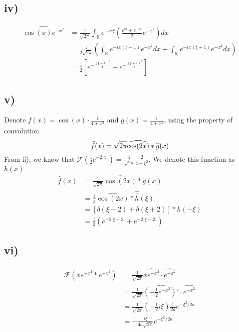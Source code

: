 \documentclass[a4paper, 11pt]{article}
\begin{document}
\begin{spacing}{1.5}
\subsection*{iv)}
\begin{align*}
\widehat{ \cos(x) e^{-x^2} }
	& = \frac{1}{\sqrt{2\pi}} \int_{\mathbb{R}} e^{-ix\xi} \left( \frac{e^{ix} + e^{-ix}}{2} e^{-x^2}\right) dx  \\
	& = \frac{1}{2\sqrt{2\pi}} \left( \int_{\mathbb{R}} e^{-ix(\xi-1)} e^{-x^2} dx + \int_{\mathbb{R}} e^{-ix(\xi+1)} e^{-x^2} dx \right)  \\
	& = \frac{1}{2} \left[ e^{-\frac{(\xi-1)^2}{4}} + e^{-\frac{(\xi+1)^2}{4}} \right]
\end{align*}

\subsection*{v)}
Denote $f(x) = \cos(x) \cdot \frac{1}{4+x^2}$ and $g(x) =\frac{1}{4+x^2} $, using the property of convolution
$$
\widehat{ f }(x) = \sqrt{2\pi} \widehat{ \cos(2x) } * \widehat{g}(x)  \\
$$
From ii), we know that $\mathcal{F} \left( \frac{1}{2} e^{-2\left|x\right|} \right) = \frac{1}{\sqrt{2\pi}}  \frac{2}{4+\xi^2} $. We denote this function as $h(x)$
\begin{align*}
\widehat{ f }(x)
	& = \frac{1}{\sqrt{2\pi}} \widehat{ \cos(2x) } * \widehat{g}(x) \\
	& = \frac{1}{\pi} \widehat{ \cos(2x) } * \widehat{\widehat{h}}(\xi) \\
	& = \left[\delta (\xi -2) + \delta (\xi +2) \right]* h(-\xi) \\
	& = \frac{1}{2} \left( e^{-2\left|\xi+2\right|} + e^{-2\left|\xi-2\right|} \right)
\end{align*}

\subsection*{vi)}
\begin{align*}
\mathcal{F} \left(xe^{-x^2} * e^{-x^2} \right)
	& = \frac{1}{\sqrt{2\pi}} \widehat{ xe^{-x^2} } \cdot \widehat{ e^{-x^2} } \\
	& = \frac{1}{\sqrt{2\pi}} \widehat{ \left(-\frac{1}{2} e^{-x^2}\right)' }  \cdot \widehat{ e^{-x^2} }\\
	& = \frac{1}{\sqrt{2\pi}} \left(-\frac{1}{2} i\xi\right) \frac{1}{2a} e^{-\xi^2 /2a} \\
	& = -\frac{i\xi}{4a\sqrt{2\pi}} e^{-\xi^2 /2a}
\end{align*}




\end{spacing}
\end{document}
